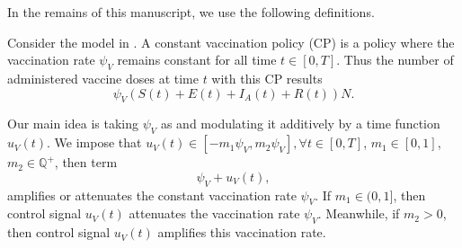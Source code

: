 

In the remains of this manuscript, we use the following definitions.
\begin{definition}
Consider the model in . A constant 
    vaccination policy (CP) is a policy where the vaccination rate 
    $\psi_V$ remains constant for all time $t \in [0, T]$. 
    Thus the number of administered vaccine doses at time $t$
    with this CP results 
\begin{equation}
        \label{eqn:constant_policy}
        \psi_V \left(
            S(t) + E(t) + I_A(t) + R(t)
        \right) N.
    \end{equation}
\end{definition}

    Our main idea is taking $\psi_V$ as  
and modulating it additively by a time function $u_V(t)$. 
We impose that 
$
    u_V(t)\in [-m_1 \psi_V, m_2 
    \psi_V],\forall t\in [0, T]
$,
 $m_1 \in [0,1]$, $m_2 \in \mathbb{Q}^{+}$, then term
\begin{equation}
    \label{eqn:vaccine_rate_modulation}
    \psi_V + u_V(t),
\end{equation}
amplifies or attenuates the constant vaccination rate $\psi_V$.
If $m_1 \in (0,1]$, then control signal $u_V(t)$ attenuates the vaccination 
rate $\psi_V$. Meanwhile, if $m_2 > 0$, then control signal $u_V(t)$ 
amplifies this vaccination rate.

